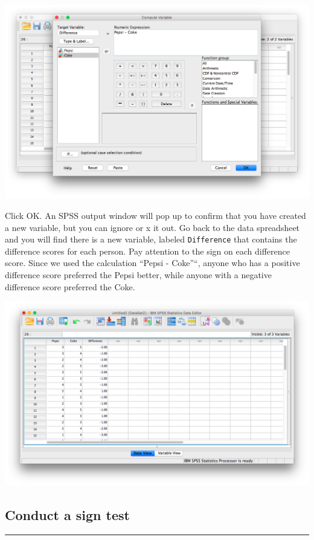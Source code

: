 \documentclass[
]{book}
\begin{document}
\includegraphics{img/5.4.13.png}

Click {OK}. An SPSS output window will pop up to confirm that you have created a new variable, but you can ignore or x it out. Go back to the data spreadsheet and you will find there is a new variable, labeled \texttt{Difference} that contains the difference scores for each person. Pay attention to the sign on each difference score. Since we used the calculation ``Pepsi - Coke''``, anyone who has a positive difference score preferred the Pepsi better, while anyone with a negative difference score preferred the Coke.

\includegraphics{img/5.4.14.png}

\hypertarget{conduct-a-sign-test}{%
\subsection{Conduct a sign test}\label{conduct-a-sign-test}}

\begin{center}\rule{0.5\linewidth}{0.5pt}\end{center}
\end{document}

